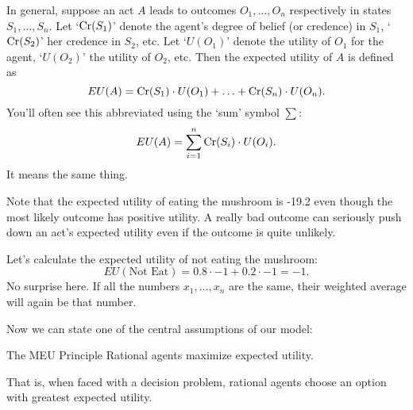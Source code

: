 In general, suppose an act $A$ leads to outcomes $O_1,\ldots,O_n$
respectively in states $S_1,\ldots, S_n$. Let `$\text{Cr}(S_1)$' denote the
agent's degree of belief (or credence) in $S_1$, `$\text{Cr}(S_2)$' her
credence in $S_2$, etc. Let `$U(O_1)$' denote the utility of $O_1$ for
the agent, `$U(O_2)$' the utility of $O_2$, etc. Then the expected utility
of $A$ is defined as
\[
EU(A) = \text{Cr}(S_1) \cdot U(O_1) + \ldots + \text{Cr}(S_n) \cdot U(O_n).
\]
You'll often see this abbreviated using the `sum' symbol $\sum$:
\[
EU(A) = \sum_{i=1}^n \text{Cr}(S_i) \cdot U(O_i).
\]
It means the same thing.



Note that the expected utility of eating the mushroom is -19.2 even
though the most likely outcome has positive utility. A really bad
outcome can seriously push down an act's expected utility even if the
outcome is quite unlikely. 

Let's calculate the expected utility of not eating the mushroom:
\[
EU(\text{Not Eat}) = 0.8 \cdot -1 + 0.2 \cdot -1 = -1.
\]
No surprise here. If all the numbers $x_1,\ldots,x_n$ are the same,
their weighted average will again be that number.

Now we can state one of the central assumptions of our model:

\begin{genericthm}{The MEU Principle}
  Rational agents maximize expected utility. 
\end{genericthm}
%
That is, when faced with a decision problem, rational agents choose an
option with greatest expected utility.


